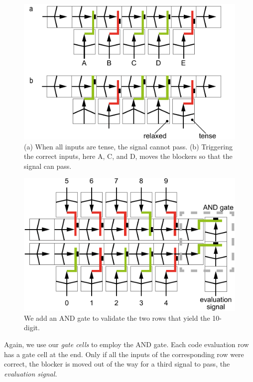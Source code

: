 \begin{figure} [h]  
    \includegraphics[width=\textwidth]{chapters/digital-metamaterials-FIG/15-code-evaluation-1--5.pdf}
    \caption[Short figure name.]{(a) When all inputs are tense, the signal cannot pass. (b) Triggering the correct inputs, here A, C, and D, moves the blockers so that the signal can pass.
    \label{fig:15-code-evaluation-1--5}}
\end{figure}

\begin{figure} [h]  
    \includegraphics[width=\textwidth]{chapters/digital-metamaterials-FIG/16-code-evaluation-0--9.pdf}
    \caption[Short figure name.]{We add an AND gate to validate the two rows that yield the 10-digit.
    \label{fig:16-code-evaluation-0--9}}
\end{figure}

Again, we use our \textit{gate cells} to employ the AND gate. Each code evaluation row has a gate cell at the end. Only if all the inputs of the corresponding row were correct, the blocker is moved out of the way for a third signal to pass, the \textit{evaluation signal.} 


